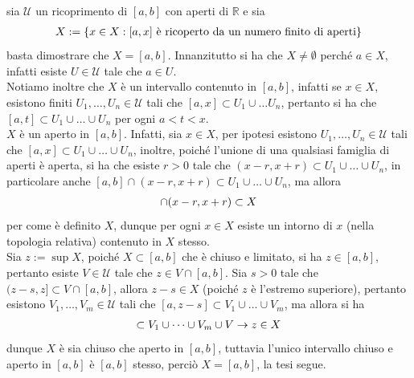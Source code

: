 \documentclass[oneside, 11pt]{amsbook}
\makeatletter
\newcommand{\0}{{(0)}}
\newcommand{\3}{{(3)}}
\theoremstyle{colonplain}
\theoremstyle{colondefinition}
\theoremstyle{colonremark}
\numberwithin{equation}{chapter}
\renewcommand{\proofname}{Dimostrazione}
\renewenvironment{proof}[1][\proofname]{\par
  \pushQED{\qed}%
  \normalfont \topsep6\p@\@plus6\p@\relax
  \trivlist
  \item[\hskip\labelsep\bfseries #1:]\ignorespaces
}{%
  \popQED\endtrivlist\@endpefalse
}
\makeatother
\begin{document}
\begin{proof}
sia $\mathcal{U}$ un ricoprimento di $[a, b]$ con aperti di $\mathbb{R}$ e sia
\begin{align}
    X := \{ x \in X : [a, x] \text{ è ricoperto da un numero finito di aperti} \} \notag
\end{align}
basta dimostrare che $X = [a, b]$. Innanzitutto si ha che $X \neq \emptyset$ perché $a \in X$, infatti esiste $U \in \mathcal{U}$ tale che $a \in U$. \\
Notiamo inoltre che $X$ è un intervallo contenuto in $[a, b]$, infatti se $x \in X$, esistono finiti $U_1, \dots, U_n \in \mathcal{U}$ tali che $[a, x] \subset U_1 \cup \dots U_n$, pertanto si ha che $[a, t] \subset U_1 \cup \dots \cup U_n$ per ogni $a < t < x$. \\
$X$ è un aperto in $[a, b]$. Infatti, sia $x \in X$, per ipotesi esistono $U_1, \dots, U_n \in \mathcal{U}$ tali che $[a, x] \subset U_1 \cup \dots \cup U_n$, inoltre, poiché l'unione di una qualsiasi famiglia di aperti è aperta, si ha che esiste $r > 0$ tale che $(x - r, x+ r) \subset U_1 \cup \dots \cup U_n$, in particolare anche $[a, b] \cap (x - r, x + r) \subset U_1 \cup \dots \cup U_n$, ma allora
\begin{align}
    [a, b] \cap (x - r, x + r) \subset X \notag
\end{align}
per come è definito $X$, dunque per ogni $x \in X$ esiste un intorno di $x$ (nella topologia relativa) contenuto in $X$ stesso. \\
Sia $z := \sup X$, poiché $X \subset [a, b]$ che è chiuso e limitato, si ha $z \in [a, b]$, pertanto esiste $V \in \mathcal{U}$ tale che $z \in V \cap [a, b]$. Sia $s > 0$ tale che $(z - s, z] \subset V \cap [a, b]$, allora $z - s \in X$ (poiché $z$ è l'estremo superiore), pertanto esistono $V_1, \dots, V_m \in \mathcal{U}$ tali che $[a, z - s] \subset V_1 \cup \dots \cup V_m$, ma allora si ha
\begin{align}
    [a, z] \subset V_1 \cup \dots \cup V_m \cup V \rightarrow z \in X \notag
\end{align}
dunque $X$ è sia chiuso che aperto in $[a, b]$, tuttavia l'unico intervallo chiuso e aperto in $[a, b]$ è $[a, b]$ stesso, perciò $X = [a, b]$, la tesi segue.
\end{proof}
\end{document}
